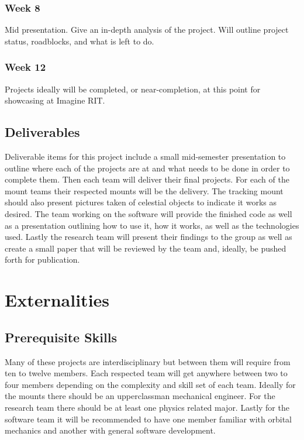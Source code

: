 \documentclass[conference]{IEEEtran} %
\begin{document}
    \subsubsection*{Week 8}
    Mid presentation.  Give an in-depth analysis of the project.  Will outline project status, roadblocks, and what is left to do.
    \subsubsection*{Week 12}
    Projects ideally will be completed, or near-completion, at this point for showcasing at Imagine RIT.



\subsection{Deliverables}
\label{subsec:deliverables}

Deliverable items for this project include a small mid-semester presentation to outline where each of the projects are at and what needs to be done in order to complete them.  Then each team will deliver their final projects.  For each of the mount teams their respected mounts will be the delivery.  The tracking mount should also present pictures taken of celestial objects to indicate it works as desired.  The team working on the software will provide the finished code as well as a presentation outlining how to use it, how it works, as well as the technologies used.  Lastly the research team will present their findings to the group as well as create a small paper that will be reviewed by the team and, ideally, be pushed forth for publication.




\section{Externalities}
\subsection{Prerequisite Skills}
Many of these projects are interdisciplinary but between them will require from ten to twelve members.  Each respected team will get anywhere between two to four members depending on the complexity and skill set of each team.  Ideally for the mounts there should be an upperclassman mechanical engineer.  For the research team there should be at least one physics related major.  Lastly for the software team it will be recommended to have one member familiar with orbital mechanics and another with general software development.
\end{document}
